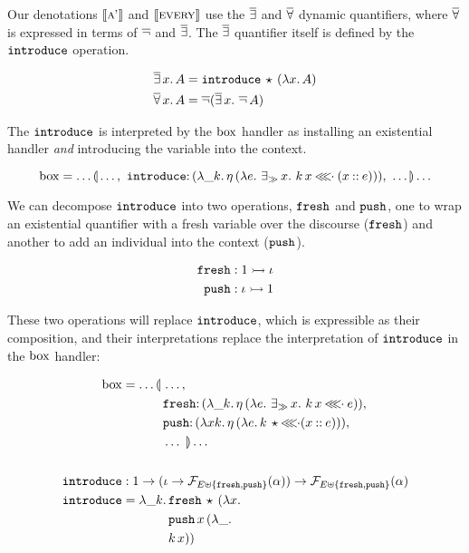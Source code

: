 Our denotations $\llbracket \textsc{a'} \rrbracket$ and $\llbracket \textsc{every} \rrbracket$ use the $\mathop{\overline{\exists}}$
and $\mathop{\overline{\forall}}$ dynamic quantifiers, where $\mathop{\overline{\forall}}$ is expressed in terms
of $\mathop{\overline{\lnot}}$ and $\mathop{\overline{\exists}}$. The $\mathop{\overline{\exists}}$ quantifier itself is defined by
the $\mathtt{introduce}$ operation.

\begin{align*}
  \mathop{\overline{\exists}} x.\,A &= \mathtt{introduce}\,\star\,(\lambda x.\, A) \\
  \mathop{\overline{\forall}} x.\,A &= \mathop{\overline{\lnot}} (\mathop{\overline{\exists}} x.\,\mathop{\overline{\lnot}} A)
\end{align*}

The $\mathtt{introduce}$ is interpreted by the $\mathrm{box}$ handler as installing an
existential handler \emph{and} introducing the variable into the context.

$$
\BOX = \ldots \banana{\ldots,\ \onto{\op{introduce}}{(\lam{\_ k}{\etaE{(\lam{e}{\existsr x.\ \ap{k}{x} \apll (x \cons e)})}})},\ \ldots} \ldots
$$

We can decompose $\mathtt{introduce}$ into two operations, $\mathtt{fresh}$ and
$\mathtt{push}$, one to wrap an existential quantifier with a fresh variable
over the discourse ($\mathtt{fresh}$) and another to add an individual into the
context ($\mathtt{push}$).

\begin{align*}
  \mathtt{fresh} &: 1 \rightarrowtail \iota \\
  \mathtt{push} &: \iota \rightarrowtail 1
\end{align*}

These two operations will replace $\mathtt{introduce}$, which is expressible as
their composition, and their interpretations replace the interpretation of
$\mathtt{introduce}$ in the $\mathrm{box}$ handler:

\begin{align*}
  \BOX &= \ldots \lban\begin{aligned}[t]
      &\ldots, \\
      &\onto{\op{fresh}}{(\lam{\_ k}{\etaE{(\lam{e}{\existsr x.\ \ap{k}{x} \apll e})}})}, \\
      &\onto{\op{push}}{(\lam{x k}{\etaE{(\lam{e}{\ap{k}{\star} \apll (x \cons e)})}})}, \\
      &\ldots\ \rban \ldots
    \end{aligned} \\
  \\
  \op{introduce} &: 1 \to (\iota \to \FF_{E \uplus \{\op{fresh},
                    \op{push}\}}(\alpha)) \to \FF_{E \uplus \{\op{fresh},
                    \op{push}\}}(\alpha) \\
  \op{introduce} &= \lam{\_ k}{\begin{aligned}[t]
      &\app{\op{fresh}}{\star}{(\lam{x}{ \\
      &\app{\op{push}}{x}{(\lam{\_}{ \\
      &\ap{k}{x}})}})}
    \end{aligned}}
\end{align*}

